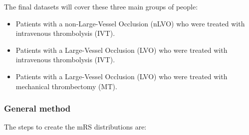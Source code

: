 The final datasets will cover these three main groups of people:

\begin{itemize}
    \item Patients with a non-Large-Vessel Occlusion (nLVO) who were treated with intravenous thrombolysis (IVT).
    \item Patients with a Large-Vessel Occlusion (LVO) who were treated with intravenous thrombolysis (IVT).
    \item Patients with a Large-Vessel Occlusion (LVO) who were treated with mechanical thrombectomy (MT).
\end{itemize}

\subsubsection{General method}

The steps to create the mRS distributions are:

